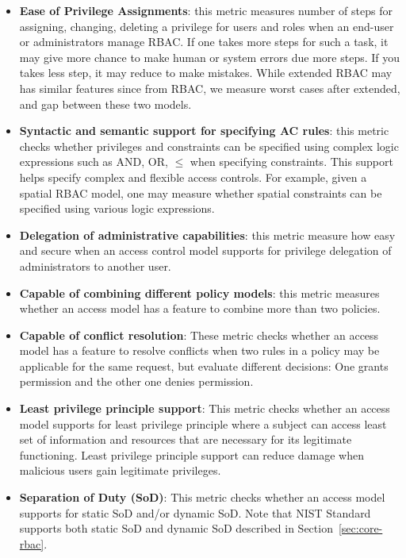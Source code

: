 \begin{itemize}
	\item \textbf{Ease of Privilege Assignments}: this metric measures number of steps for assigning, changing, deleting a privilege for users and roles when an end-user or administrators manage RBAC. If one takes more steps for such a task, it may give more chance to make human or system errors due more steps. If you takes less step, it may reduce to make mistakes.  While extended RBAC may has similar features since from RBAC, we measure worst cases after extended, and gap between these two models.
	
	\item \textbf{Syntactic and semantic support for specifying AC rules}: this metric checks whether privileges and constraints can be specified using complex logic expressions such as AND, OR, $\leq$ when specifying constraints. This support helps specify complex and flexible access controls. For example, given a spatial RBAC model, one may measure whether spatial constraints can be specified using various logic expressions.

	\item \textbf{Delegation of administrative capabilities}: this metric measure how easy and secure when an access control model supports for privilege delegation of administrators to another user.

	\item \textbf{Capable of combining different policy models}: this metric measures whether an access model has a feature to combine more than two policies.

	\item \textbf{Capable of conflict resolution}: These metric checks whether an access model has a feature to resolve conflicts when two rules in a policy may be applicable for the same request, but evaluate different decisions: One grants permission and the other one denies permission.

	\item \textbf{Least privilege principle support}: This metric checks whether an access model supports for least privilege principle where a subject can access least set of information and resources that are necessary for its legitimate functioning. Least privilege principle support can reduce damage when malicious users gain legitimate privileges.

	\item \textbf{Separation of Duty (SoD)}: This metric checks whether an access model supports for static SoD and/or dynamic SoD. Note that NIST Standard supports both static SoD and dynamic SoD described in Section~\ref{sec:core-rbac}.
\end{itemize}

